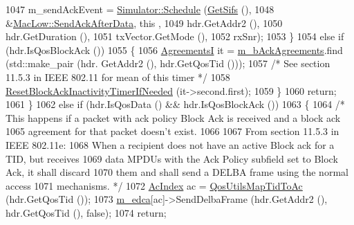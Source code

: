 \begin{DoxyCode}
1047               m\_sendAckEvent = \hyperlink{classns3_1_1Simulator_a671882c894a08af4a5e91181bf1eec13}{Simulator::Schedule} (\hyperlink{classns3_1_1MacLow_a9107421b7ed9f291d60b8344b4918e56}{GetSifs} (),
1048                                                     &\hyperlink{classns3_1_1MacLow_a8db1635644b89072dfcb5fbc2330031b}{MacLow::SendAckAfterData}, \textcolor{keyword}{this}
      ,
1049                                                     hdr.GetAddr2 (),
1050                                                     hdr.GetDuration (),
1051                                                     txVector.GetMode (),
1052                                                     rxSnr);
1053             \}
1054           \textcolor{keywordflow}{else} \textcolor{keywordflow}{if} (hdr.IsQosBlockAck ())
1055             \{
1056               \hyperlink{classns3_1_1MacLow_a7876cc9b328cdb0508f2a7b7647eab10}{AgreementsI} it = \hyperlink{classns3_1_1MacLow_a53482df1a7e6f136cfa8ce50fa10adc2}{m\_bAckAgreements}.find (std::make\_pair (hdr.
      GetAddr2 (), hdr.GetQosTid ()));
1057               \textcolor{comment}{/* See section 11.5.3 in IEEE 802.11 for mean of this timer */}
1058               \hyperlink{classns3_1_1MacLow_aafa012c5d2dde80484d6546c802f02f8}{ResetBlockAckInactivityTimerIfNeeded} (it->second.first);
1059             \}
1060           \textcolor{keywordflow}{return};
1061         \}
1062       \textcolor{keywordflow}{else} \textcolor{keywordflow}{if} (hdr.IsQosData () && hdr.IsQosBlockAck ())
1063         \{
1064           \textcolor{comment}{/* This happens if a packet with ack policy Block Ack is received and a block ack}
1065 \textcolor{comment}{             agreement for that packet doesn't exist.}
1066 \textcolor{comment}{}
1067 \textcolor{comment}{             From section 11.5.3 in IEEE 802.11e:}
1068 \textcolor{comment}{             When a recipient does not have an active Block ack for a TID, but receives}
1069 \textcolor{comment}{             data MPDUs with the Ack Policy subfield set to Block Ack, it shall discard}
1070 \textcolor{comment}{             them and shall send a DELBA frame using the normal access}
1071 \textcolor{comment}{             mechanisms. */}
1072           \hyperlink{group__wifi_gab422b4562ba272b39a9b6bca3513f3ac}{AcIndex} ac = \hyperlink{group__wifi_ga4e36efcff6dd83eaee42e1af0de43d48}{QosUtilsMapTidToAc} (hdr.GetQosTid ());
1073           \hyperlink{classns3_1_1MacLow_a754751ba4152c9337611a5f015045a44}{m\_edca}[ac]->SendDelbaFrame (hdr.GetAddr2 (), hdr.GetQosTid (), \textcolor{keyword}{false});
1074           \textcolor{keywordflow}{return};

\end{DoxyCode}
